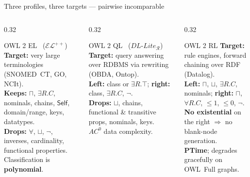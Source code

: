 \documentclass[10pt,aspectratio=169,xcolor=table]{beamer}
\newcommand{\dl}[1]{\ensuremath{\mathcal{#1}}}
\newcommand{\EL}{\dl{EL}}
\newcommand{\dllite}[1]{\ensuremath{\textit{DL-Lite}_{#1}}}
\newcommand{\hl}[1]{\textcolor{accent}{\textbf{#1}}}
\begin{document}
\begin{frame}{Three profiles, three targets --- pairwise incomparable}
  \begin{columns}[T]
    \begin{column}{0.32\textwidth}
      \begin{block}{OWL 2 EL \ ($\EL^{++}$)}
        \footnotesize
        \textbf{Target:} very large terminologies (SNOMED~CT, GO, NCIt).\\[3pt]
        \textbf{Keeps:} $\sqcap$, $\exists R.C$, nominals, chains, $\mathsf{Self}$,
        domain/range, keys, datatypes.\\[3pt]
        \textbf{Drops:} $\forall$, $\sqcup$, $\neg$, inverses, cardinality,
        functional properties.\\[3pt]
        Classification is \hl{polynomial}.
      \end{block}
    \end{column}
    \begin{column}{0.32\textwidth}
      \begin{block}{OWL 2 QL \ ($\dllite{\mathcal{R}}$)}
        \footnotesize
        \textbf{Target:} query answering over RDBMS via rewriting (OBDA, Ontop).\\[3pt]
        \textbf{Left:} class or $\exists R.\top$; \textbf{right:} class, $\exists R.C$, $\neg$.\\[3pt]
        \textbf{Drops:} $\sqcup$, chains, functional \& transitive props, nominals, keys.\\[3pt]
        \hl{$AC^0$} data complexity.
      \end{block}
    \end{column}
    \begin{column}{0.32\textwidth}
      \begin{block}{OWL 2 RL}
        \footnotesize
        \textbf{Target:} rule engines, forward chaining over RDF (Datalog).\\[3pt]
        \textbf{Left:} $\sqcap$, $\sqcup$, $\exists R.C$, nominals; \textbf{right:} $\sqcap$,
        $\forall R.C$, ${\leq}1$, ${\leq}0$, $\neg$.\\[3pt]
        \textbf{No existential} on the right $\Rightarrow$ no blank-node generation.\\[3pt]
        \hl{PTime}; degrades gracefully on OWL~Full graphs.
      \end{block}
    \end{column}
  \end{columns}
\end{frame}
\end{document}

